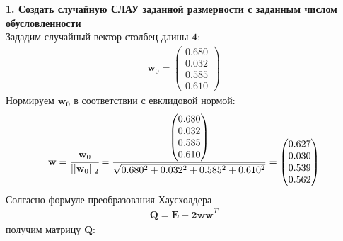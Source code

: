 \documentclass[a4paper]{article}
\begin{document}



\newpage
{}
\setcounter{page}{2}
{\Large{\textbf{1. Создать случайную СЛАУ заданной размерности с заданным числом обусловленности}}}\\
Зададим случайный вектор-столбец длины $\mathbf{4}$:
\begin{align}
    \mathbf{w}_0 =
    \begin{pmatrix}
        0.680 \\
        0.032 \\
        0.585 \\
        0.610
    \end{pmatrix}
\end{align}
Нормируем $\mathbf{w_0}$ в соответствии с евклидовой нормой:
\begin{align}
    \mathbf{w} = \cfrac{\mathbf{w}_0}{||\mathbf{w}_0||_2} =
    \frac{
    \begin{pmatrix}
        0.680 \\
        0.032 \\
        0.585 \\
        0.610
    \end{pmatrix}}{\sqrt{0.680^2+0.032^2+0.585^2+0.610^2}} =
    \begin{pmatrix}
        0.627 \\
        0.030 \\
        0.539 \\
        0.562
    \end{pmatrix}
\end{align}
Солгасно формуле преобразования Хаусхолдера
\begin{align}
    \mathbf{Q = E - 2ww}^T
\end{align}
получим матрицу $\mathbf{Q}$:
\end{document}

